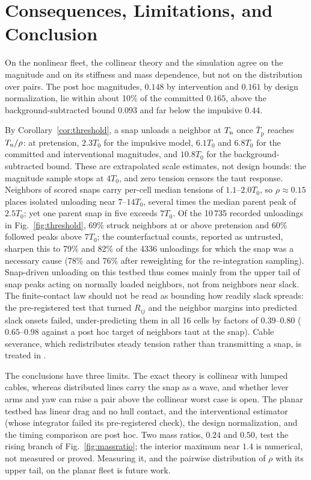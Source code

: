 \section{Consequences, Limitations, and Conclusion}\label{sec:consequences}

On the nonlinear fleet, the collinear theory and the simulation agree on the magnitude and on its stiffness and mass dependence, but not on the distribution over pairs. The post hoc magnitudes, $0.148$ by intervention and $0.161$ by design normalization, lie within about 10\% of the committed $0.165$, above the background-subtracted bound $0.093$ and far below the impulsive $0.44$.

By Corollary~\ref{cor:threshold}, a snap unloads a neighbor at $T_{\mathrm{n}}$ once $\bar T_{\mathrm p}$ reaches $T_{\mathrm{n}}/\rho$: at pretension, $2.3T_0$ for the impulsive model, $6.1T_0$ and $6.8T_0$ for the committed and interventional magnitudes, and $10.8T_0$ for the background-subtracted bound. These are extrapolated scale estimates, not design bounds: the magnitude sample stops at $4T_0$, and zero tension censors the taut response. Neighbors of scored snaps carry per-cell median tensions of $1.1$--$2.0T_0$, so $\rho\approx0.15$ places isolated unloading near $7$--$14T_0$, several times the median parent peak of $2.5T_0$; yet one parent snap in five exceeds $7T_0$. Of the 10\,735 recorded unloadings in Fig.~\ref{fig:threshold}, 69\% struck neighbors at or above pretension and 60\% followed peaks above $7T_0$; the counterfactual counts, reported as untrusted, sharpen this to 79\% and 82\% of the 4336 unloadings for which the snap was a necessary cause (78\% and 76\% after reweighting for the re-integration sampling). Snap-driven unloading on this testbed thus comes mainly from the upper tail of snap peaks acting on normally loaded neighbors, not from neighbors near slack. The finite-contact law should not be read as bounding how readily slack spreads: the pre-registered test that turned $R_{ij}$ and the neighbor margins into predicted slack onsets failed, under-predicting them in all 16 cells by factors of $0.39$--$0.80$ ($0.65$--$0.98$ against a post hoc target of neighbors taut at the snap). Cable severance, which redistributes steady tension rather than transmitting a snap, is treated in \cite{hajieghrary2026passive}.

The conclusions have three limits. The exact theory is collinear with lumped cables, whereas distributed lines carry the snap as a wave, and whether lever arms and yaw can raise a pair above the collinear worst case is open. The planar testbed has linear drag and no hull contact, and the interventional estimator (whose integrator failed its pre-registered check), the design normalization, and the timing comparison are post hoc. Two mass ratios, $0.24$ and $0.50$, test the rising branch of Fig.~\ref{fig:massratio}; the interior maximum near $1.4$ is numerical, not measured or proved. Measuring it, and the pairwise distribution of $\rho$ with its upper tail, on the planar fleet is future work.

